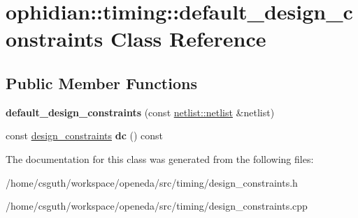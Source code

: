 \hypertarget{classophidian_1_1timing_1_1default__design__constraints}{\section{ophidian\-:\-:timing\-:\-:default\-\_\-design\-\_\-constraints Class Reference}
\label{classophidian_1_1timing_1_1default__design__constraints}
}
\subsection*{Public Member Functions}
\begin{DoxyCompactItemize}
\item 
\hypertarget{classophidian_1_1timing_1_1default__design__constraints_a5d06c49860baa2beb57d1af9a4b26aa1}{{\bfseries default\-\_\-design\-\_\-constraints} (const \hyperlink{classophidian_1_1netlist_1_1netlist}{netlist\-::netlist} \&netlist)}\label{classophidian_1_1timing_1_1default__design__constraints_a5d06c49860baa2beb57d1af9a4b26aa1}

\item 
\hypertarget{classophidian_1_1timing_1_1default__design__constraints_af994b8ed73752324b74f26a86985fdc9}{const \hyperlink{structophidian_1_1timing_1_1design__constraints}{design\-\_\-constraints} {\bfseries dc} () const }\label{classophidian_1_1timing_1_1default__design__constraints_af994b8ed73752324b74f26a86985fdc9}

\end{DoxyCompactItemize}


The documentation for this class was generated from the following files\-:\begin{DoxyCompactItemize}
\item 
/home/csguth/workspace/openeda/src/timing/design\-\_\-constraints.\-h\item 
/home/csguth/workspace/openeda/src/timing/design\-\_\-constraints.\-cpp\end{DoxyCompactItemize}
